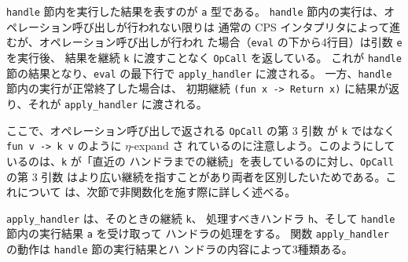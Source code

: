 
\texttt{handle} 節内を実行した結果を表すのが \texttt{a} 型である。
\texttt{handle} 節内の実行は、オペレーション呼び出しが行われない限りは
通常の CPS インタプリタによって進むが、オペレーション呼び出しが行われ
た場合（\texttt{eval} の下から4行目）は引数 \texttt{e} を実行後、
結果を継続 \texttt{k} に渡すことなく \texttt{OpCall} を返している。
これが \texttt{handle} 節の結果となり、\texttt{eval} の最下行で
\texttt{apply\_handler} に渡される。
一方、\texttt{handle} 節内の実行が正常終了した場合は、
初期継続 \texttt{(fun x -> Return x)} に結果が返り、それが
\texttt{apply\_handler} に渡される。

ここで、オペレーション呼び出しで返される \texttt{OpCall} の第 3 引数
が \texttt{k} ではなく \texttt{fun v -> k v} のように $\eta$-expand さ
れているのに注意しよう。このようにしているのは、\texttt{k} が「直近の
ハンドラまでの継続」を表しているのに対し、\texttt{OpCall} の第 3 引数
はより広い継続を指すことがあり両者を区別したいためである。これについて
は、次節で非関数化を施す際に詳しく述べる。

\texttt{apply\_handler} は、そのときの継続 \texttt{k}、
処理すべきハンドラ \texttt{h}、そして
\texttt{handle} 節内の実行結果 \texttt{a} を受け取って
ハンドラの処理をする。
関数 \texttt{apply\_handler} の動作は \texttt{handle} 節の実行結果とハ
ンドラの内容によって3種類ある。



